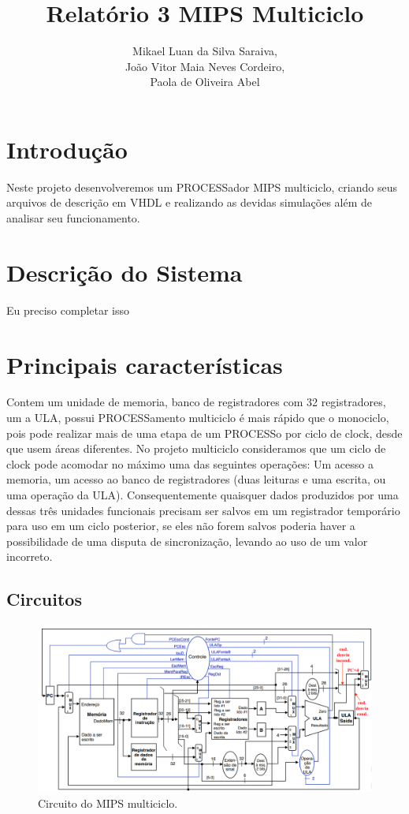 \documentclass{article}
\title{Relatório 3 \- MIPS Multiciclo}
\author{%
    Mikael Luan da Silva Saraiva, \\
    João Vitor Maia Neves Cordeiro, \\
    Paola de Oliveira Abel
    }
\begin{document}
    \maketitle

    \section{Introdução}

    Neste projeto desenvolveremos um PROCESSador MIPS multiciclo, criando seus
    arquivos de descrição em VHDL e realizando as devidas simulações além de
    analisar seu funcionamento.

    \section{Descrição do Sistema}

    Eu preciso completar isso

    \section{Principais características}

    Contem um unidade de memoria, banco de registradores com 32 registradores,
    um a ULA, possui PROCESSamento multiciclo é mais rápido que o monociclo,
    pois pode realizar mais de uma etapa de um PROCESSo por ciclo de clock,
    desde que usem áreas diferentes. No projeto multiciclo consideramos que um
    ciclo de clock pode acomodar no máximo uma das seguintes operações: Um
    acesso a memoria, um acesso ao banco de registradores (duas leituras e uma
    escrita, ou uma operação da ULA). Consequentemente quaisquer dados
    produzidos por uma dessas três unidades funcionais precisam ser salvos em
    um registrador temporário para uso em um ciclo posterior, se eles não forem
    salvos poderia haver a possibilidade de uma disputa de sincronização,
    levando ao uso de um valor incorreto.

        \subsection{Circuitos}


        \begin{figure}[H]
            \centering %
            \includegraphics[width=\textwidth]{circuito_mips.png} %
            \caption{Circuito do MIPS multiciclo.}
            \label{figura:mips}
        \end{figure}
\end{document}
